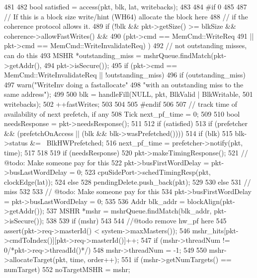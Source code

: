 \begin{DoxyCode}
{481 
482     bool satisfied = access(pkt, blk, lat, writebacks);
483 
484 #if 0
485 
487     // If this is a block size write/hint (WH64) allocate the block here
488     // if the coherence protocol allows it.
489     if (!blk && pkt->getSize() >= blkSize && coherence->allowFastWrites() &&
490         (pkt->cmd == MemCmd::WriteReq
491          || pkt->cmd == MemCmd::WriteInvalidateReq) ) {
492         // not outstanding misses, can do this
493         MSHR *outstanding_miss = mshrQueue.findMatch(pkt->getAddr(),
494                                                      pkt->isSecure());
495         if (pkt->cmd == MemCmd::WriteInvalidateReq || !outstanding_miss) {
496             if (outstanding_miss) {
497                 warn("WriteInv doing a fastallocate"
498                      "with an outstanding miss to the same address\n");
499             }
500             blk = handleFill(NULL, pkt, BlkValid | BlkWritable,
501                                    writebacks);
502             ++fastWrites;
503         }
504     }
505 #endif
506 
507     // track time of availability of next prefetch, if any
508     Tick next_pf_time = 0;
509 
510     bool needsResponse = pkt->needsResponse();
511 
512     if (satisfied) {
513         if (prefetcher && (prefetchOnAccess || (blk && blk->wasPrefetched()))) {
514             if (blk)
515                 blk->status &= ~BlkHWPrefetched;
516             next_pf_time = prefetcher->notify(pkt, time);
517         }
518 
519         if (needsResponse) {
520             pkt->makeTimingResponse();
521             // @todo: Make someone pay for this
522             pkt->busFirstWordDelay = pkt->busLastWordDelay = 0;
523             cpuSidePort->schedTimingResp(pkt, clockEdge(lat));
524         } else {
528             pendingDelete.push_back(pkt);
529         }
530     } else {
531         // miss
532 
533         // @todo: Make someone pay for this
534         pkt->busFirstWordDelay = pkt->busLastWordDelay = 0;
535 
536         Addr blk_addr = blockAlign(pkt->getAddr());
537         MSHR *mshr = mshrQueue.findMatch(blk_addr, pkt->isSecure());
538 
539         if (mshr) {
543 
544             //@todo remove hw_pf here
545             assert(pkt->req->masterId() < system->maxMasters());
546             mshr_hits[pkt->cmdToIndex()][pkt->req->masterId()]++;
547             if (mshr->threadNum != 0/*pkt->req->threadId()*/) {
548                 mshr->threadNum = -1;
549             }
550             mshr->allocateTarget(pkt, time, order++);
551             if (mshr->getNumTargets() == numTarget) {
552                 noTargetMSHR = mshr;
}}}}
\end{DoxyCode}
